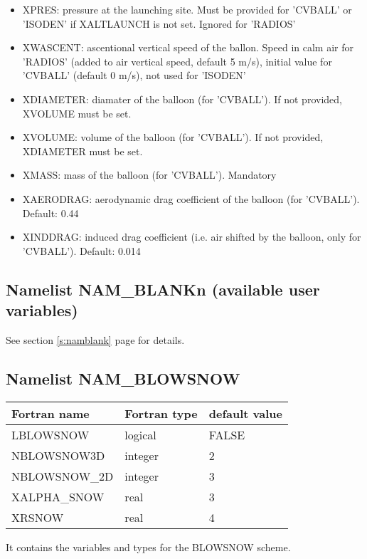 \begin{itemize}
\item XPRES: pressure at the launching site. Must be provided for 'CVBALL' or 'ISODEN' if XALTLAUNCH is not set. Ignored for 'RADIOS'

\item XWASCENT: ascentional vertical speed of the ballon. Speed in calm air for 'RADIOS' (added to air vertical speed, default 5 m/s), initial value for 'CVBALL' (default 0 m/s), not used for 'ISODEN'

\item XDIAMETER: diamater of the balloon (for 'CVBALL'). If not provided, XVOLUME must be set.

\item XVOLUME: volume of the balloon (for 'CVBALL'). If not provided, XDIAMETER must be set.

\item XMASS: mass of the balloon (for 'CVBALL'). Mandatory

\item XAERODRAG: aerodynamic drag coefficient of the balloon (for 'CVBALL'). Default: 0.44

\item XINDDRAG: induced drag coefficient (i.e. air shifted by the balloon, only for 'CVBALL'). Default: 0.014

\end{itemize}


\subsection{Namelist NAM\_BLANKn (available user variables)}
See section \ref{s:namblank} page \pageref{s:namblank} for details.

\subsection{Namelist NAM\_BLOWSNOW }

\begin{center}
\begin{tabular} {|l|l|l|}
\hline
Fortran name & Fortran type & default value \\
\hline

LBLOWSNOW    & logical & FALSE     \\
NBLOWSNOW3D  & integer & 2         \\
NBLOWSNOW\_2D& integer & 3       \\
XALPHA\_SNOW & real    &3 \\
XRSNOW       & real    & 4\\
\hline
\end{tabular}
\end{center}
It contains the variables and types for the BLOWSNOW scheme.

